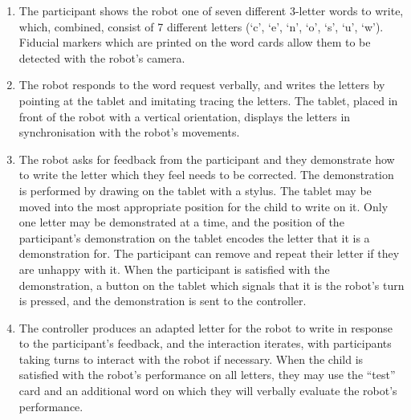 \documentclass{sig-alternate}
\begin{document}
\begin{enumerate}

    \item The participant shows the robot one of seven different 3-letter words
        to write, which, combined, consist of 7 different letters (`c', `e',
        `n', `o', `s', `u', `w'). Fiducial markers which are printed on the word
        cards allow them to be detected with the robot's camera. 

    \item The robot responds to the word request verbally, and writes the
        letters by pointing at the tablet and imitating tracing the letters. The
        tablet, placed in front of the robot with a vertical orientation,
        displays the letters in synchronisation with the robot's movements. 

    \item The robot asks for feedback from the participant and they demonstrate
        how to write the letter which they feel needs to be corrected. The
        demonstration is performed by drawing on the tablet with a stylus. The
        tablet may be moved into the most appropriate position for the child to
        write on it. Only one letter may be demonstrated at a time, and the
        position of the participant's demonstration on the tablet encodes the
        letter that it is a demonstration for. The participant can remove and
        repeat their letter if they are unhappy with it.
        When the participant is satisfied with the demonstration, a button on
        the tablet which signals that it is the robot's turn is pressed, and the
        demonstration is sent to the controller.

    \item The controller produces an adapted letter for the robot to write in
        response to the participant's feedback, and the interaction iterates,
        with participants taking turns to interact with the robot if necessary.
        When the child is satisfied with the robot's performance on all letters,
        they may use the ``test'' card and an additional word on which they will
        verbally evaluate the robot's performance. 

\end{enumerate}

	
\end{document}
